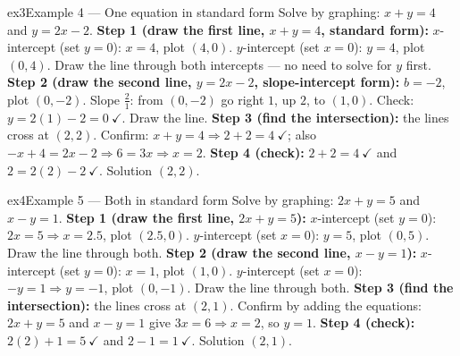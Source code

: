 \documentclass[11pt]{article}
\begin{document}
\begin{example}{ex3}{Example 4 --- One equation in standard form}
Solve by graphing: $x+y=4$ and $y=2x-2$.
\soln \textbf{Step 1 (draw the first line, $x+y=4$, standard form):} $x$-intercept (set $y=0$): $x=4$, plot $(4,0)$. $y$-intercept (set $x=0$): $y=4$, plot $(0,4)$. Draw the line through both intercepts --- no need to solve for $y$ first.
\textbf{Step 2 (draw the second line, $y=2x-2$, slope-intercept form):} $b=-2$, plot $(0,-2)$. Slope $\tfrac21$: from $(0,-2)$ go right $1$, up $2$, to $(1,0)$. Check: $y=2(1)-2=0\ \checkmark$. Draw the line.
\textbf{Step 3 (find the intersection):} the lines cross at $(2,2)$. Confirm: $x+y=4\Rightarrow 2+2=4\ \checkmark$; also $-x+4=2x-2\Rightarrow 6=3x\Rightarrow x=2$.
\textbf{Step 4 (check):} $2+2=4\ \checkmark$ and $2=2(2)-2\ \checkmark$. Solution $(2,2)$.
\end{example}

\begin{example}{ex4}{Example 5 --- Both in standard form}
Solve by graphing: $2x+y=5$ and $x-y=1$.
\soln \textbf{Step 1 (draw the first line, $2x+y=5$):} $x$-intercept (set $y=0$): $2x=5\Rightarrow x=2.5$, plot $(2.5,0)$. $y$-intercept (set $x=0$): $y=5$, plot $(0,5)$. Draw the line through both.
\textbf{Step 2 (draw the second line, $x-y=1$):} $x$-intercept (set $y=0$): $x=1$, plot $(1,0)$. $y$-intercept (set $x=0$): $-y=1\Rightarrow y=-1$, plot $(0,-1)$. Draw the line through both.
\textbf{Step 3 (find the intersection):} the lines cross at $(2,1)$. Confirm by adding the equations: $2x+y=5$ and $x-y=1$ give $3x=6\Rightarrow x=2$, so $y=1$.
\textbf{Step 4 (check):} $2(2)+1=5\ \checkmark$ and $2-1=1\ \checkmark$. Solution $(2,1)$.
\end{example}
\end{document}
